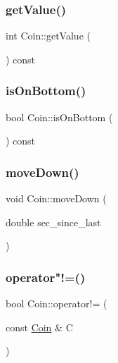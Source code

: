 \subsubsection{\texorpdfstring{get\+Value()}{getValue()}}
{\footnotesize\ttfamily int Coin\+::get\+Value (\begin{DoxyParamCaption}{ }\end{DoxyParamCaption}) const}

\mbox{\label{class_coin_a210e01a3e058d02076fe3b138785703b}} 
\subsubsection{\texorpdfstring{is\+On\+Bottom()}{isOnBottom()}}
{\footnotesize\ttfamily bool Coin\+::is\+On\+Bottom (\begin{DoxyParamCaption}{ }\end{DoxyParamCaption}) const}

\mbox{\label{class_coin_af45c31b09753600787ffe0319db28298}} 
\subsubsection{\texorpdfstring{move\+Down()}{moveDown()}}
{\footnotesize\ttfamily void Coin\+::move\+Down (\begin{DoxyParamCaption}\item[{double}]{sec\+\_\+since\+\_\+last }\end{DoxyParamCaption})}

\mbox{\label{class_coin_a67152a3b3ca628c5a122bea522a80b6e}} 
\subsubsection{\texorpdfstring{operator"!=()}{operator!=()}}
{\footnotesize\ttfamily bool Coin\+::operator!= (\begin{DoxyParamCaption}\item[{const \mbox{\hyperlink{class_coin}{Coin}} \&}]{C }\end{DoxyParamCaption})}

\mbox{\label{class_coin_ae12c00f84a81afbb7edb2aa3b9842683}} 
